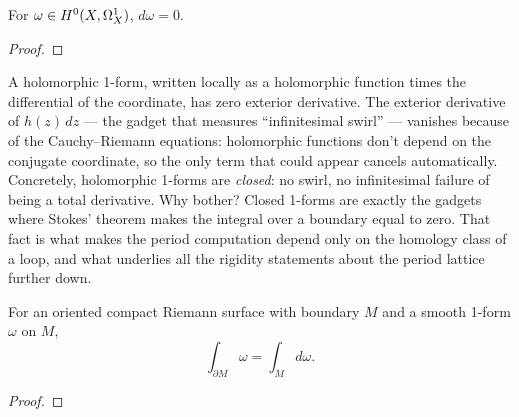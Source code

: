 \begin{lemma}
\label{lem:holomorphic-form-is-closed}
For \(\omega\in H^{0}(X,\Omega^{1}_{X})\), \(d\omega=0\).
\leanok
\end{lemma}
\begin{proof}\leanok\end{proof}

\begin{layman}
A holomorphic 1-form, written locally as a holomorphic function times the
differential of the coordinate, has zero exterior derivative. The
exterior derivative of \(h(z)\,dz\) --- the gadget that measures
``infinitesimal swirl'' --- vanishes because of the Cauchy--Riemann
equations: holomorphic functions don't depend on the conjugate
coordinate, so the only term that could appear cancels automatically.
Concretely, holomorphic 1-forms are \emph{closed}: no swirl, no
infinitesimal failure of being a total derivative. Why bother? Closed
1-forms are exactly the gadgets where Stokes' theorem makes the integral
over a boundary equal to zero. That fact is what makes the period
computation depend only on the homology class of a loop, and what
underlies all the rigidity statements about the period lattice further
down.
\end{layman}

\begin{theorem}
\label{thm:stokes-on-rs-with-boundary}
For an oriented compact Riemann surface with boundary \(M\) and a smooth
1-form \(\omega\) on \(M\),
\[
  \int_{\partial M}\omega = \int_{M} d\omega.
\]
\leanok
\end{theorem}
\begin{proof}\leanok\end{proof}

